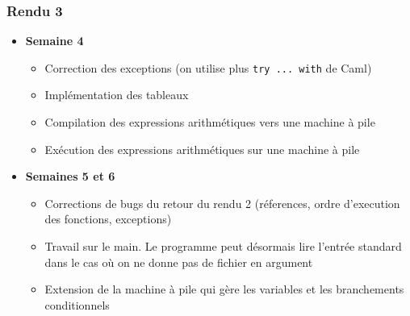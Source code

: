 \subsubsection*{Rendu 3}
\begin{itemize}
 \item \textbf{Semaine 4 }
    \begin{itemize}
      \item Correction des exceptions (on utilise plus \texttt{try ... with} de Caml)
      \item Implémentation des tableaux
      \item Compilation des expressions arithmétiques vers une machine à pile
      \item Exécution des expressions arithmétiques sur une machine à pile
    \end{itemize}
  
  \item \textbf{Semaines 5 et 6}
    \begin{itemize}
      \item Corrections de bugs du retour du rendu 2 (réferences, ordre d'execution des fonctions, exceptions)
      \item Travail sur le main. Le programme peut désormais lire l'entrée standard dans le cas où on ne donne pas de fichier en argument
      \item Extension de la machine à pile qui gère les variables et les branchements conditionnels
    \end{itemize}

\end{itemize}


